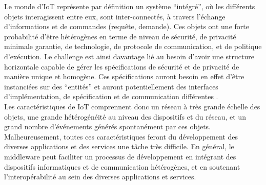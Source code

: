 Le monde d’IoT représente par définition un système “intégré”, où les diffé\-rents objets interagissent entre eux, sont inter-connectés, à travers l’échange d’informations et de commandes (requête, demande). Ces objets ont une forte probabilité d’être hétérogènes en terme de niveau de sécurité, de privacité minimale garantie, de technologie, de protocole de communication, et de politique d’exécution. Le challenge est ainsi davantage lié au besoin d’avoir une structure horizontale capable de gérer les spécifications de sécurité et de privacité de manière unique et homogène. Ces spécifications auront besoin en effet d’être instanciées sur des “entités” et auront potentiellement des interfaces d’implémentation, de spécification et de communication différentes \cite{vermesan2014internet}.
\\

Les caractéristiques de IoT comprennent donc un réseau à très grande échelle des objets, une grande hétérogénéité au niveau des dispositifs et du réseau, et un grand nombre d'événements générés spontanément par ces objets. Malheureusement, toutes ces caractéristiques feront du développement des diverses applications et des services une tâche très difficile. En général, le middleware peut faciliter un processus de développement en intégrant des dispositifs informatiques et de communication hétérogènes, et en soutenant l'interopérabilité au sein des diverses applications et services.

